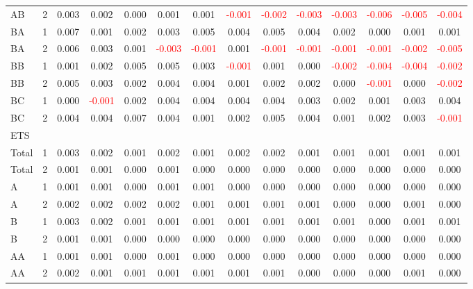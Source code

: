 \begin{table}[H]
{\begin{tabular}{llcccccccccccc}
AB & 2 & 0.003 & 0.002 & 0.000 & 0.001 & 0.001 & \textcolor{red}{-0.001} & \textcolor{red}{-0.002} & \textcolor{red}{-0.003} & \textcolor{red}{-0.003} & \textcolor{red}{-0.006} & \textcolor{red}{-0.005} & \textcolor{red}{-0.004}\\
BA & 1 & 0.007 & 0.001 & 0.002 & 0.003 & 0.005 & 0.004 & 0.005 & 0.004 & 0.002 & 0.000 & 0.001 & 0.001\\
BA & 2 & 0.006 & 0.003 & 0.001 & \textcolor{red}{-0.003} & \textcolor{red}{-0.001} & 0.001 & \textcolor{red}{-0.001} & \textcolor{red}{-0.001} & \textcolor{red}{-0.001} & \textcolor{red}{-0.001} & \textcolor{red}{-0.002} & \textcolor{red}{-0.005}\\
BB & 1 & 0.001 & 0.002 & 0.005 & 0.005 & 0.003 & \textcolor{red}{-0.001} & 0.001 & 0.000 & \textcolor{red}{-0.002} & \textcolor{red}{-0.004} & \textcolor{red}{-0.004} & \textcolor{red}{-0.002}\\
BB & 2 & 0.005 & 0.003 & 0.002 & 0.004 & 0.004 & 0.001 & 0.002 & 0.002 & 0.000 & \textcolor{red}{-0.001} & 0.000 & \textcolor{red}{-0.002}\\
BC & 1 & 0.000 & \textcolor{red}{-0.001} & 0.002 & 0.004 & 0.004 & 0.004 & 0.004 & 0.003 & 0.002 & 0.001 & 0.003 & 0.004\\
BC & 2 & 0.004 & 0.004 & 0.007 & 0.004 & 0.001 & 0.002 & 0.005 & 0.004 & 0.001 & 0.002 & 0.003 & \textcolor{red}{-0.001}\\
\hline
ETS &  &  &  &  &  &  &  &  &  &  &  &  & \\
\hline
Total & 1 & 0.003 & 0.002 & 0.001 & 0.002 & 0.001 & 0.002 & 0.002 & 0.001 & 0.001 & 0.001 & 0.001 & 0.001\\
Total & 2 & 0.001 & 0.001 & 0.000 & 0.001 & 0.000 & 0.000 & 0.000 & 0.000 & 0.000 & 0.000 & 0.000 & 0.000\\
A & 1 & 0.001 & 0.001 & 0.000 & 0.001 & 0.001 & 0.000 & 0.000 & 0.000 & 0.000 & 0.000 & 0.000 & 0.000\\
A & 2 & 0.002 & 0.002 & 0.002 & 0.002 & 0.001 & 0.001 & 0.001 & 0.001 & 0.000 & 0.000 & 0.001 & 0.000\\
B & 1 & 0.003 & 0.002 & 0.001 & 0.001 & 0.001 & 0.001 & 0.001 & 0.001 & 0.001 & 0.000 & 0.001 & 0.001\\
B & 2 & 0.001 & 0.001 & 0.000 & 0.000 & 0.000 & 0.000 & 0.000 & 0.000 & 0.000 & 0.000 & 0.000 & 0.000\\
AA & 1 & 0.001 & 0.001 & 0.000 & 0.001 & 0.000 & 0.000 & 0.000 & 0.000 & 0.000 & 0.000 & 0.000 & 0.000\\
AA & 2 & 0.002 & 0.001 & 0.001 & 0.001 & 0.001 & 0.001 & 0.001 & 0.000 & 0.000 & 0.000 & 0.001 & 0.000\\

\end{tabular}}
\end{table}
